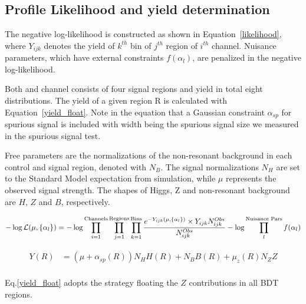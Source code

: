 \label{sec:vbf-likelihood}
\subsection{Profile Likelihood and yield determination}
The negative log-likelihood is constructed as shown in Equation~\ref{likelihood}, 
where $Y_{ijk}$ denotes the yield of $k^{th}$ bin of $j^{th}$ region of $i^{th}$ channel. 
Nuisance parameters, which have external constraints $f(\alpha_l)$, are penalized in the negative log-likelihood. 

Both \twocentral{} and  \fourcentral{} channel consists of four signal regions and yield in total eight \Mbb{} distributions.
The yield of a given region R is calculated with Equation~\ref{yield_float}. Note in the equation that a Gaussian constraint $\alpha_{sp}$  for spurious signal is included with width being the spurious signal size we measured in the spurious signal test.

Free parameters are the normalizations of the non-resonant background in each control and
signal region, denoted with $N_B$.
The signal normalizations $N_H$ are set to the Standard Model expectation from simulation,
while $\mu$ represents the observed signal strength.
The shapes of Higgs, Z and non-resonant background are $H$, $Z$ and $B$, respectively.

\begin{equation}
\label{likelihood}
-\log\mathcal{L}(\mu, \{\alpha_{l}\} )= -\log \prod_{i=1}^{\textnormal{Channels}} \prod_{j=1}^{\textnormal{Regions}} \prod_{k=1}^{\textnormal{Bins}} \frac{e^{-Y_{ijk}(\mu, \{\alpha_l\})} \times Y_{ijk}N_{ijk}^{Obs} }{N_{ijk}^{Obs}} - \log \prod_{l}^{\textnormal{Nuisance Pars}} f(\alpha_l)
\end{equation}

\begin{equation}
\label{yield_float}
\begin{split}
Y(R) &= (\mu + \alpha_{sp}(R))N_{H}H(R)+ N_{B}B(R)+ \mu_{z}(R)N_{Z}Z  \\
\end{split}
\end{equation}


Eq.\ref{yield_float} adopts the strategy floating the $Z$ contributions in all BDT regions. 



